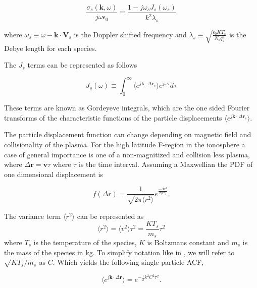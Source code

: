 \documentclass[10pt]{report}
\begin{document}
\begin{equation}
\label{eq:cond}
\frac{\sigma_{s}(\mathbf{k},\omega)}{j\omega\epsilon_0} = \frac{1-j\omega_s J_s(\omega_s)}{k^2\lambda_s}
\end{equation}

\noindent where $\omega_s \equiv \omega-\mathbf{k}\cdot\mathbf{V}_s $ is the Doppler shifted frequency and $\lambda_s \equiv \sqrt{\frac{\epsilon_0 KT_s}{N_s q_s^2}}$ is the Debye length for each species.

The $J_s$ terms can be represented as follows

\begin{equation}
\label{eq:gord}
J_s(\omega)\equiv \int_0^\infty \langle e^{j\mathbf{k}\cdot\Delta \mathbf{r}_s}\rangle e^{j\omega\tau}d\tau
\end{equation}

\noindent These terms are known as Gordeyeve integrals, which are the one sided Fourier transforms of the characteristic functions of the particle displacements $\langle e^{j\mathbf{k}\cdot\Delta\mathbf{r}_s}\rangle$.  

The particle displacement function can change depending on magnetic field and collisionality of the plasma. For the high latitude F-region in the ionosphere a case of general importance is one of a non-magnitized and collision less plasma, where $\Delta\mathbf{r} = \mathbf{v}\tau$ where $\tau$ is the time interval. Assuming a Maxwellian the PDF of one dimensional displacement is

\begin{equation}
\label{eq:pdfr}
f(\Delta r) = \frac{1}{\sqrt{2\pi \langle r^2 \rangle}}e^{\frac{-\Delta r^2}{2\langle r^2\rangle}}.
\end{equation}
 
\noindent The variance term $\langle r^2 \rangle$ can be represented as
\begin{equation}
\label{eq:var}
\langle r^2 \rangle = \langle v^2 \rangle \tau^2 = \frac{KT_s}{m_s} \tau^2
\end{equation}
 \noindent where $T_s$ is the temperature of the species, $K$ is Boltzmans constant and $m_s$ is the mass of the species in kg. To simplify notation like in \cite{kudeki:milla:1}, we will refer to $\sqrt{KT_s/m_s}$ as $C$. Which yields the following single particle ACF,
 
 \begin{equation}
\label{eq:pdfall}
\langle e^{j\mathbf{k}\cdot\Delta \mathbf{r}}\rangle= e^{-\frac{1}{2}k^2C^2 \tau^2}.
\end{equation}
 
\end{document}
